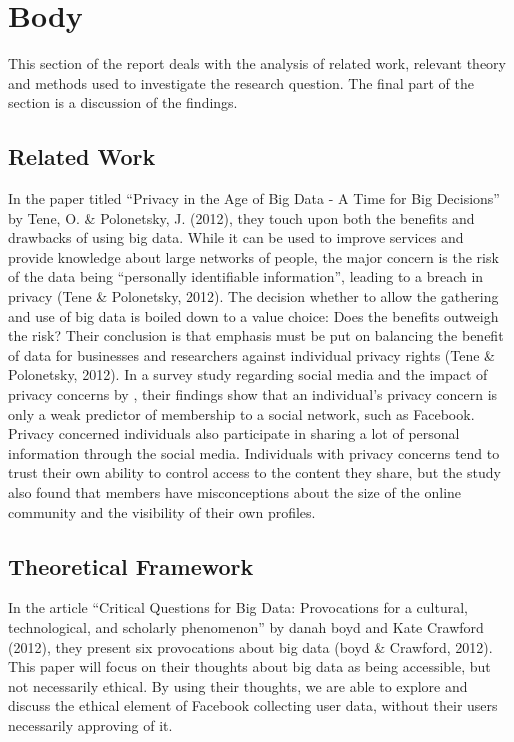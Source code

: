 \chapter{Body}
This section of the report deals with the analysis of related work, relevant theory and methods used to investigate the research question. The final part of the section is a discussion of the findings.

\section{Related Work}
In the paper titled “Privacy in the Age of Big Data - A Time for Big Decisions” by Tene, O. \& Polonetsky, J. (2012), they touch upon both the benefits and drawbacks of using big data. While it can be used to improve services and provide knowledge about large networks of people, the major concern is the risk of the data being “personally identifiable information”, leading to a breach in privacy (Tene \& Polonetsky, 2012). The decision whether to allow the gathering and use of big data is boiled down to a value choice: Does the benefits outweigh the risk? Their conclusion is that emphasis must be put on balancing the benefit of data for businesses and researchers against individual privacy rights (Tene \& Polonetsky, 2012).
In a survey study regarding social media and the impact of privacy concerns by \cite{imagined}, their findings show that an individual’s privacy concern is only a weak predictor of membership to a social network, such as Facebook. Privacy concerned individuals also participate in sharing a lot of personal information through the social media. Individuals with privacy concerns tend to trust their own ability to control access to the content they share, but the study also found that members have misconceptions about the size of the online community and the visibility of their own profiles.

\section{Theoretical Framework}
In the article “Critical Questions for Big Data: Provocations for a cultural, technological, and scholarly phenomenon” by danah boyd and Kate Crawford (2012), they present six provocations about big data (boyd \& Crawford, 2012). This paper will focus on their thoughts about big data as being accessible, but not necessarily ethical. By using their thoughts, we are able to explore and discuss the ethical element of Facebook collecting user data, without their users necessarily approving of it.

